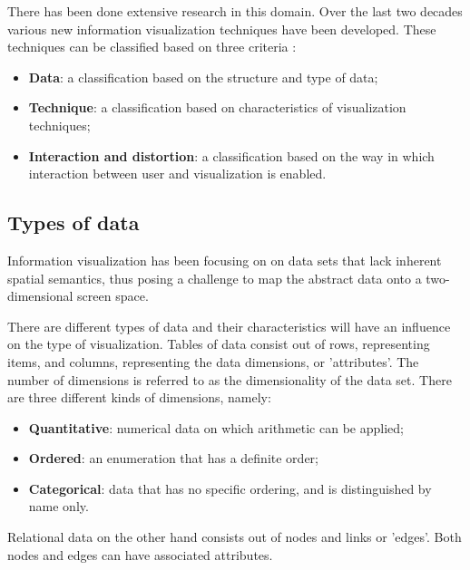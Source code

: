 There has been done extensive research in this domain. Over the last two decades various new information visualization techniques have been developed. These techniques can be classified based on three criteria \cite{keim:2002}:

\begin{itemize}
	\item \textbf{Data}: a classification based on the structure and type of data;
	\item \textbf{Technique}: a classification based on characteristics of visualization techniques;
	\item \textbf{Interaction and distortion}: a classification based on the way in which interaction between user and visualization is enabled.
\end{itemize}


\subsection{Types of data}\label{chapter:literature_study:section:interaction:subsection:datatypes}


Information visualization has been focusing on on data sets that lack inherent spatial semantics, thus posing a challenge to map the abstract data onto a two-dimensional screen space\cite{keim:2002}.

There are different types of data and their characteristics will have an influence on the type of visualization. Tables of data consist out of rows, representing items, and columns, representing the data dimensions, or 'attributes'. The number of dimensions is referred to as the dimensionality of the data set\cite{keim:2002}. There are three different kinds of dimensions, namely\cite{shirley:2009}:

\begin{itemize}
	\item \textbf{Quantitative}: numerical data on which arithmetic can be applied;
	\item \textbf{Ordered}: an enumeration that has a definite order;
	\item \textbf{Categorical}: data that has no specific ordering, and is distinguished by name only.
\end{itemize}

Relational data on the other hand consists out of nodes and links or 'edges'\cite{keim:2002, shirley:2009}. Both nodes and edges can have associated attributes.

